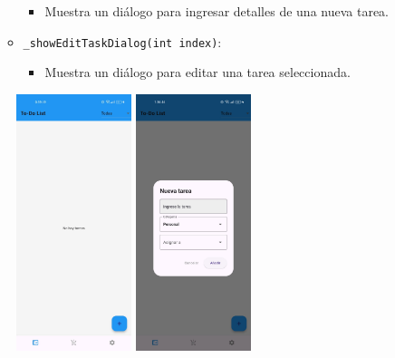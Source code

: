 \documentclass{article}
\begin{document}
\begin{flushleft}
\begin{itemize}
\begin{itemize}
        \begin{itemize}
            \item Muestra un di\'alogo para ingresar detalles de una nueva tarea.
        \end{itemize}
        \item \texttt{\_showEditTaskDialog(int index)}:
        \begin{itemize}
            \item Muestra un di\'alogo para editar una tarea seleccionada.
        \end{itemize}
    \end{itemize}
\end{itemize}

\begin{figure}[H]
   
    \includegraphics[width=0.3\textwidth]{TFG/img/img/todo.jpeg}
        \includegraphics[width=0.3\textwidth]{TFG/img/img/todotarea.jpeg}

\end{figure}
\end{flushleft}
\end{document}
